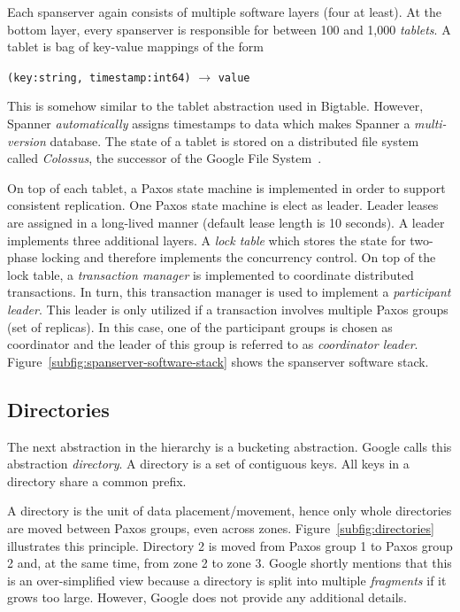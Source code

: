\documentclass[onecolumn, a4paper, 10pt]{article}
\begin{document}
Each spanserver again consists of multiple software layers (four at least). At
the bottom layer, every spanserver is responsible for between 100 and 1,000
\emph{tablets}. A tablet is bag of key-value mappings of the form
\begin{center}
  \texttt{(key:string, timestamp:int64)} $\rightarrow$ \texttt{value}
\end{center}
This is somehow similar to the tablet abstraction used in Bigtable. However,
Spanner \emph{automatically} assigns timestamps to data which makes Spanner a
\emph{multi-version} database. The state of a tablet is stored on a distributed
file system called \emph{Colossus}, the successor of the Google File
System~\cite{Ghemawat:2003}.

On top of each tablet, a Paxos state machine is implemented in order to support
consistent replication. One Paxos state machine is elect as leader. Leader leases
are assigned in a long-lived manner (default lease length is 10 seconds). A leader
implements three additional layers. A \emph{lock table} which stores the state
for two-phase locking and therefore implements the concurrency control. On top
of the lock table, a \emph{transaction manager} is implemented to coordinate
distributed transactions. In turn, this transaction manager is used to implement
a \emph{participant leader}. This leader is only utilized if a transaction
involves multiple Paxos groups (set of replicas). In this case, one of the
participant groups is chosen as coordinator and the leader of this group is
referred to as \emph{coordinator leader}.
Figure~\ref{subfig:spanserver-software-stack} shows the spanserver software stack.

\subsection{Directories}
\label{subsec:directories}

The next abstraction in the hierarchy is a bucketing abstraction. Google calls
this abstraction \emph{directory}. A directory is a set of contiguous keys.
All keys in a directory share a common prefix.

A directory is the unit of data placement/movement, hence only whole directories
are moved between Paxos groups, even across zones. Figure~\ref{subfig:directories}
illustrates this principle. Directory 2 is moved from Paxos group 1 to Paxos group
2 and, at the same time, from zone 2 to zone 3. Google shortly mentions that this
is an over-simplified view because a directory is split into multiple
\emph{fragments} if it grows too large. However, Google does not provide any
additional details.
\end{document}
